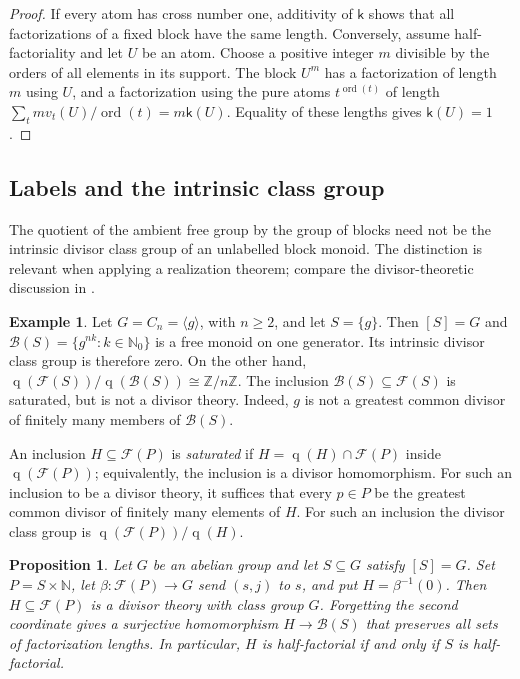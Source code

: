 \documentclass[11pt,reqno]{amsart}
\numberwithin{equation}{section}
\newtheorem{proposition}[theorem]{Proposition}
\theoremstyle{definition}
\newtheorem{example}[theorem]{Example}
\theoremstyle{remark}
\newcommand{\Z}{\mathbb Z}
\newcommand{\N}{\mathbb N}
\newcommand{\Nzero}{\mathbb N_0}
\newcommand{\B}{\mathcal B}
\newcommand{\F}{\mathcal F}
\DeclareMathOperator{\ord}{ord}
\DeclareMathOperator{\q}{q}
\begin{document}
\begin{proof}
If every atom has cross number one, additivity of $\mathsf k$
shows that all factorizations of a fixed block have the same
length. Conversely, assume half-factoriality and let $U$ be an
atom. Choose a positive integer $m$ divisible by the orders of
all elements in its support. The block $U^m$ has a factorization
of length $m$ using $U$, and a factorization using the pure atoms
$t^{\ord(t)}$ of length
$\sum_t mv_t(U)/\ord(t)=m\mathsf k(U)$. Equality of these
lengths gives $\mathsf k(U)=1$.
\end{proof}

\subsection{Labels and the intrinsic class group}

The quotient of the ambient free group by the group of blocks need
not be the intrinsic divisor class group of an unlabelled block
monoid. The distinction is relevant when applying a realization theorem;
compare the divisor-theoretic discussion in
\cite[\S2]{Schmid2010}.

\begin{example}\label{ex:class-trap}
Let $G=C_n=\langle g\rangle$, with $n\ge2$, and let $S=\{g\}$.
Then $[S]=G$ and $\B(S)=\{g^{nk}:k\in\Nzero\}$ is a free monoid
on one generator. Its intrinsic divisor class group is therefore
zero. On the other hand,
$\q(\F(S))/\q(\B(S))\cong\Z/n\Z$. The inclusion
$\B(S)\subseteq\F(S)$ is saturated, but is not a divisor theory.
Indeed, $g$ is not a greatest common divisor of finitely many
members of $\B(S)$.
\end{example}

An inclusion $H\subseteq\mathcal{F}(P)$ is \emph{saturated} if
$H=\operatorname{q}(H)\cap\mathcal{F}(P)$ inside
$\operatorname{q}(\mathcal{F}(P))$; equivalently, the inclusion
is a divisor homomorphism. For such an inclusion to be a
divisor theory, it suffices that every $p\in P$ be the
greatest common divisor of finitely many elements of $H$.
For such an inclusion the divisor class group is
$\q(\F(P))/\q(H)$.

\begin{proposition}\label{prop:labels}
Let $G$ be an abelian group and let $S\subseteq G$ satisfy $[S]=G$.
Set $P=S\times\N$, let $\beta:\F(P)\to G$ send $(s,j)$ to $s$,
and put $H=\beta^{-1}(0)$. Then $H\subseteq\F(P)$ is a divisor
theory with class group $G$. Forgetting the second coordinate gives
a surjective homomorphism $H\to\B(S)$ that preserves all sets of
factorization lengths. In particular, $H$ is half-factorial if and
only if $S$ is half-factorial.
\end{proposition}
\end{document}
